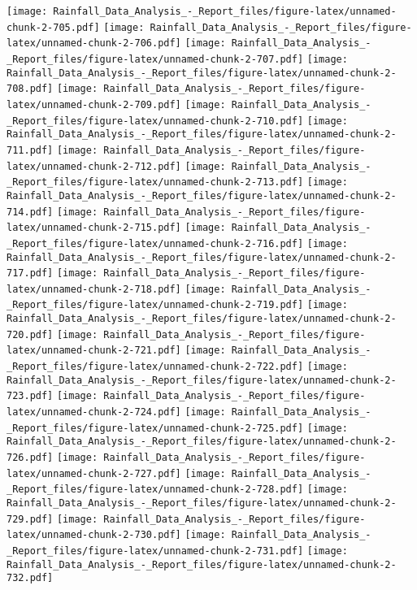 \documentclass[
]{article}
\begin{document}
\texttt{[image: Rainfall\_Data\_Analysis\_-\_Report\_files/figure-latex/unnamed-chunk-2-705.pdf]}
\texttt{[image: Rainfall\_Data\_Analysis\_-\_Report\_files/figure-latex/unnamed-chunk-2-706.pdf]}
\texttt{[image: Rainfall\_Data\_Analysis\_-\_Report\_files/figure-latex/unnamed-chunk-2-707.pdf]}
\texttt{[image: Rainfall\_Data\_Analysis\_-\_Report\_files/figure-latex/unnamed-chunk-2-708.pdf]}
\texttt{[image: Rainfall\_Data\_Analysis\_-\_Report\_files/figure-latex/unnamed-chunk-2-709.pdf]}
\texttt{[image: Rainfall\_Data\_Analysis\_-\_Report\_files/figure-latex/unnamed-chunk-2-710.pdf]}
\texttt{[image: Rainfall\_Data\_Analysis\_-\_Report\_files/figure-latex/unnamed-chunk-2-711.pdf]}
\texttt{[image: Rainfall\_Data\_Analysis\_-\_Report\_files/figure-latex/unnamed-chunk-2-712.pdf]}
\texttt{[image: Rainfall\_Data\_Analysis\_-\_Report\_files/figure-latex/unnamed-chunk-2-713.pdf]}
\texttt{[image: Rainfall\_Data\_Analysis\_-\_Report\_files/figure-latex/unnamed-chunk-2-714.pdf]}
\texttt{[image: Rainfall\_Data\_Analysis\_-\_Report\_files/figure-latex/unnamed-chunk-2-715.pdf]}
\texttt{[image: Rainfall\_Data\_Analysis\_-\_Report\_files/figure-latex/unnamed-chunk-2-716.pdf]}
\texttt{[image: Rainfall\_Data\_Analysis\_-\_Report\_files/figure-latex/unnamed-chunk-2-717.pdf]}
\texttt{[image: Rainfall\_Data\_Analysis\_-\_Report\_files/figure-latex/unnamed-chunk-2-718.pdf]}
\texttt{[image: Rainfall\_Data\_Analysis\_-\_Report\_files/figure-latex/unnamed-chunk-2-719.pdf]}
\texttt{[image: Rainfall\_Data\_Analysis\_-\_Report\_files/figure-latex/unnamed-chunk-2-720.pdf]}
\texttt{[image: Rainfall\_Data\_Analysis\_-\_Report\_files/figure-latex/unnamed-chunk-2-721.pdf]}
\texttt{[image: Rainfall\_Data\_Analysis\_-\_Report\_files/figure-latex/unnamed-chunk-2-722.pdf]}
\texttt{[image: Rainfall\_Data\_Analysis\_-\_Report\_files/figure-latex/unnamed-chunk-2-723.pdf]}
\texttt{[image: Rainfall\_Data\_Analysis\_-\_Report\_files/figure-latex/unnamed-chunk-2-724.pdf]}
\texttt{[image: Rainfall\_Data\_Analysis\_-\_Report\_files/figure-latex/unnamed-chunk-2-725.pdf]}
\texttt{[image: Rainfall\_Data\_Analysis\_-\_Report\_files/figure-latex/unnamed-chunk-2-726.pdf]}
\texttt{[image: Rainfall\_Data\_Analysis\_-\_Report\_files/figure-latex/unnamed-chunk-2-727.pdf]}
\texttt{[image: Rainfall\_Data\_Analysis\_-\_Report\_files/figure-latex/unnamed-chunk-2-728.pdf]}
\texttt{[image: Rainfall\_Data\_Analysis\_-\_Report\_files/figure-latex/unnamed-chunk-2-729.pdf]}
\texttt{[image: Rainfall\_Data\_Analysis\_-\_Report\_files/figure-latex/unnamed-chunk-2-730.pdf]}
\texttt{[image: Rainfall\_Data\_Analysis\_-\_Report\_files/figure-latex/unnamed-chunk-2-731.pdf]}
\texttt{[image: Rainfall\_Data\_Analysis\_-\_Report\_files/figure-latex/unnamed-chunk-2-732.pdf]}
\end{document}
